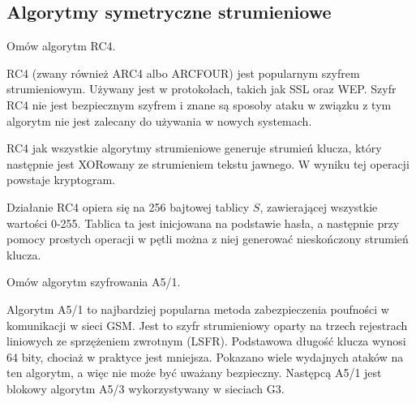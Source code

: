 \documentclass[answers,11pt]{exam}
\begin{document}
\subsection{Algorytmy symetryczne strumieniowe}
\begin{questions}

\question Omów algorytm RC4.
\begin{solution}
RC4 (zwany również ARC4 albo ARCFOUR) jest popularnym szyfrem strumieniowym. Używany jest w protokołach, takich jak SSL oraz WEP. Szyfr RC4 nie jest bezpiecznym szyfrem i znane są sposoby ataku w związku z tym algorytm nie jest zalecany do używania w nowych systemach.

RC4 jak wszystkie algorytmy strumieniowe generuje strumień klucza, który następnie jest XORowany ze strumieniem tekstu jawnego. W wyniku tej operacji powstaje kryptogram.

Działanie RC4 opiera się na 256 bajtowej tablicy $S$, zawierającej wszystkie wartości 0-255. Tablica ta jest inicjowana na podstawie hasła, a następnie przy pomocy prostych operacji w pętli można z niej generować nieskończony strumień klucza. 
\end{solution}

\question Omów algorytm szyfrowania A5/1.
\begin{solution}
Algorytm A5/1 to najbardziej popularna metoda zabezpieczenia poufności w komunikacji w sieci GSM. Jest to szyfr strumieniowy oparty na trzech rejestrach liniowych ze sprzężeniem zwrotnym (LSFR). Podstawowa długość klucza wynosi 64 bity, chociaż w praktyce jest mniejsza. Pokazano wiele wydajnych ataków na ten algorytm, a więc nie może być uważany bezpieczny. Następcą A5/1 jest blokowy algorytm A5/3 wykorzystywany w sieciach G3.
\end{solution}

\end{questions}
\end{document}
